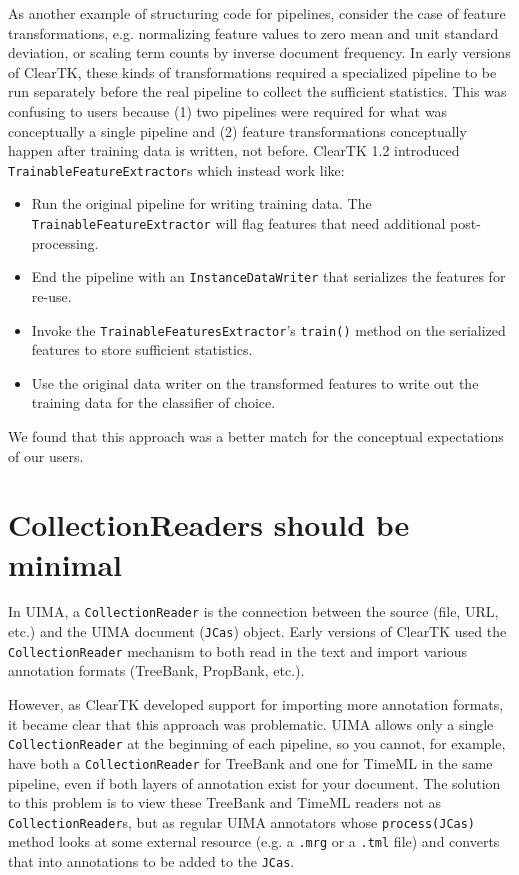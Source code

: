 \documentclass[10pt, a4paper]{article}
\newcommand{\code}[1]{\texttt{\small #1}}
\begin{document}
As another example of structuring code for pipelines, consider the case of feature transformations, e.g. normalizing feature values to zero mean and unit standard deviation, or scaling term counts by inverse document frequency.
In early versions of ClearTK, these kinds of transformations required a specialized pipeline to be run separately before the real pipeline to collect the sufficient statistics.
This was confusing to users because (1) two pipelines were required for what was conceptually a single pipeline and (2) feature transformations conceptually happen after training data is written, not before.
ClearTK 1.2 introduced \code{TrainableFeatureExtractor}s which instead work like:
\begin{itemize}
\item Run the original pipeline for writing training data. The \code{TrainableFeatureExtractor} will flag features that need additional post-processing.
\item End the pipeline with an \code{InstanceDataWriter} that serializes the features for re-use.
\item Invoke the \code{TrainableFeaturesExtractor}'s \code{train()} method on the serialized features to store sufficient statistics.
\item Use the original data writer on the transformed features to write out the training data for the classifier of choice.
\end{itemize}
We found that this approach was a better match for the conceptual expectations of our users.


\section{CollectionReaders should be minimal}
In UIMA, a \code{CollectionReader} is the connection between the source (file, URL, etc.) and the UIMA document (\code{JCas}) object.
Early versions of ClearTK used the \code{CollectionReader} mechanism to both read in the text and import various annotation formats (TreeBank, PropBank, etc.).

However, as ClearTK developed support for importing more annotation formats, it became clear that this approach was problematic.
UIMA allows only a single \code{CollectionReader} at the beginning of each pipeline, so you cannot, for example, have both a \code{CollectionReader} for TreeBank and one for TimeML in the same pipeline, even if both layers of annotation exist for your document.
The solution to this problem is to view these TreeBank and TimeML readers not as \code{CollectionReader}s, but as regular UIMA annotators whose \code{process(JCas)} method looks at some external resource (e.g. a \code{.mrg} or a \code{.tml} file) and converts that into annotations to be added to the \code{JCas}.
\end{document}
